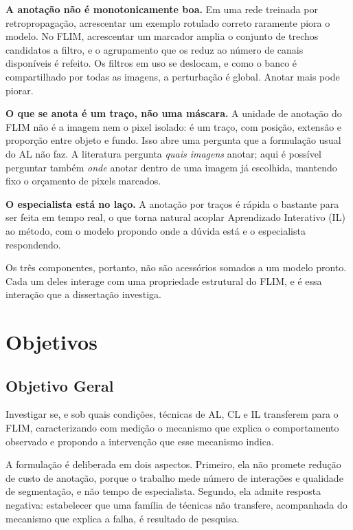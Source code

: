 \textbf{A anotação não é monotonicamente boa.} Em uma rede treinada por retropropagação, acrescentar um exemplo rotulado correto raramente piora o modelo. No \ac{FLIM}, acrescentar um marcador amplia o conjunto de trechos candidatos a filtro, e o agrupamento que os reduz ao número de canais disponíveis é refeito. Os filtros em uso se deslocam, e como o banco é compartilhado por todas as imagens, a perturbação é global. Anotar mais pode piorar.

\textbf{O que se anota é um traço, não uma máscara.} A unidade de anotação do \ac{FLIM} não é a imagem nem o pixel isolado: é um traço, com posição, extensão e proporção entre objeto e fundo. Isso abre uma pergunta que a formulação usual do \ac{AL} não faz. A literatura pergunta \emph{quais imagens} anotar; aqui é possível perguntar também \emph{onde} anotar dentro de uma imagem já escolhida, mantendo fixo o orçamento de pixels marcados.

\textbf{O especialista está no laço.} A anotação por traços é rápida o bastante para ser feita em tempo real, o que torna natural acoplar Aprendizado Interativo (\ac{IL}) \cite{xu2016deep_arxiv,sofiiuk2020fbrs_arxiv} ao método, com o modelo propondo onde a dúvida está e o especialista respondendo.

Os três componentes, portanto, não são acessórios somados a um modelo pronto. Cada um deles interage com uma propriedade estrutural do \ac{FLIM}, e é essa interação que a dissertação investiga.

\section{Objetivos}

\subsection{Objetivo Geral}

Investigar se, e sob quais condições, técnicas de \ac{AL}, \ac{CL} e \ac{IL} transferem para o \ac{FLIM}, caracterizando com medição o mecanismo que explica o comportamento observado e propondo a intervenção que esse mecanismo indica.

A formulação é deliberada em dois aspectos. Primeiro, ela não promete redução de custo de anotação, porque o trabalho mede número de interações e qualidade de segmentação, e não tempo de especialista. Segundo, ela admite resposta negativa: estabelecer que uma família de técnicas não transfere, acompanhada do mecanismo que explica a falha, é resultado de pesquisa.

